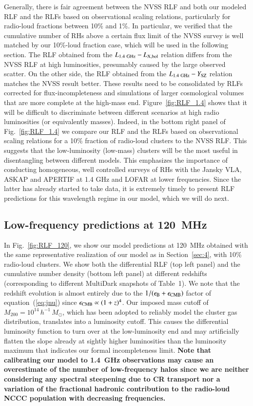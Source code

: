 \documentclass[useAMS,usenatbib]{mn2e}
\begin{document}
Generally, there is fair agreement between the NVSS RLF and both our modeled RLF
and the RLFs based on observational scaling relations, particularly for
radio-loud fractions between 10\% and 1\%. In particular, we verified that the
cumulative number of RHs above a certain flux limit of the NVSS survey is well
matched by our 10\%-loud fraction case, which will be used in the following
section.  The RLF obtained from the $L_{1.4~{\mathrm{GHz}}}-L_{{\mathrm{X,bol}}}$ relation
differs from the NVSS RLF at high luminosities, presumably caused by the large
observed scatter.  On the other side, the RLF obtained from the
$L_{1.4~{\mathrm{GHz}}}-Y_{{\mathrm{SZ}}}$ relation matches the NVSS result better. These
results need to be consolidated by RLFs corrected for flux-incompleteness and
simulations of larger cosmological volumes that are more complete at the
high-mass end. Figure~\ref{fig:RLF_1.4} shows that it will be difficult to
discriminate between different scenarios at high radio luminosities (or
equivalently masses). Indeed, in the bottom right panel of
Fig.~\ref{fig:RLF_1.4} we compare our RLF and the RLFs based on observational
scaling relations for a 10\% fraction of radio-loud clusters to the NVSS
RLF. This suggests that the low-luminosity (low-mass) clusters will be the most
useful in disentangling between different models. This emphasizes the importance
of conducting homogeneous, well controlled surveys of RHs with the
Jansky VLA, ASKAP \citep{2011PASA...28..215N} and APERTIF
\citep{2012JApA..tmp...34R} at 1.4 GHz and LOFAR at lower frequencies. Since the
latter has already started to take data, it is extremely timely to present RLF
predictions for this wavelength regime in our model, which we will do next.


\subsection{Low-frequency predictions at 120~MHz}

In Fig.~\ref{fig:RLF_120}, we show our model predictions at 120~MHz obtained
with the same representative realization of our model as in Section~\ref{sec:4},
with 10\% radio-loud clusters. We show both the differential RLF (top left
panel) and the cumulative number density (bottom left panel) at different
redshifts (corresponding to different MultiDark snapshots of Table~1).  We note
that the redshift evolution is almost entirely due to the
$1/(\epsilon_{{\mathrm{B}}}+\epsilon_{{\mathrm{CMB}}})$ factor of equation~(\ref{eq:jnu})
since $\epsilon_{\mathrm{CMB}}\propto (1+z)^4$.  Our imposed mass cutoff of
$M_{200}=10^{14}\,h^{-1}\,M_\odot$, which has been adopted to reliably model the
cluster gas distribution, translates into a luminosity cutoff. This causes the
differential luminosity function to turn over at the low-luminosity end and may
artificially flatten the slope already at sightly higher luminosities than the
luminosity maximum that indicates our formal incompleteness limit.  {\bf Note that
calibrating our model to 1.4~GHz observations may cause an overestimate of the
number of low-frequency halos since we are neither considering any spectral
steepening due to CR transport nor a variation of the fractional hadronic
contribution to the radio-loud NCCC population with decreasing frequencies.}
\end{document}
